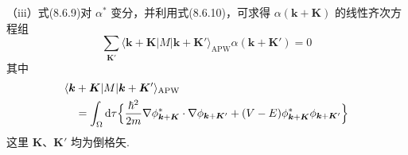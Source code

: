 （iii）式(8.6.9)对 $\alpha^{*}$ 变分，并利用式(8.6.10)，可求得 $\alpha(\boldsymbol{k}+\boldsymbol{K})$ 的线性齐次方程组
\begin{equation}
  \sum_{\boldsymbol{K}'}\langle\boldsymbol{k}+\boldsymbol{K}|M|\boldsymbol{k}+\boldsymbol{K}'\rangle_{\mathrm{APW}}\alpha(\boldsymbol{k}+\boldsymbol{K}')=0
\end{equation}
其中
\begin{equation}
\begin{aligned}
  &\langle\boldsymbol{k}+\boldsymbol{K}|M|\boldsymbol{k}+\boldsymbol{K}'\rangle_{\mathrm{APW}}\\
  &\quad=\int_{\Omega}\mathrm{d}\tau\Bigl\{\frac{\hbar^{2}}{2m}\nabla\phi_{\boldsymbol{k}+\boldsymbol{K}}^{*}\cdot\nabla\phi_{\boldsymbol{k}+\boldsymbol{K}'}
  +(V-E)\phi_{\boldsymbol{k}+\boldsymbol{K}}^{*}\phi_{\boldsymbol{k}+\boldsymbol{K}'}\Bigr\}
\end{aligned}
\end{equation}
这里 $\boldsymbol{K}$、$\boldsymbol{K}'$ 均为倒格矢.

